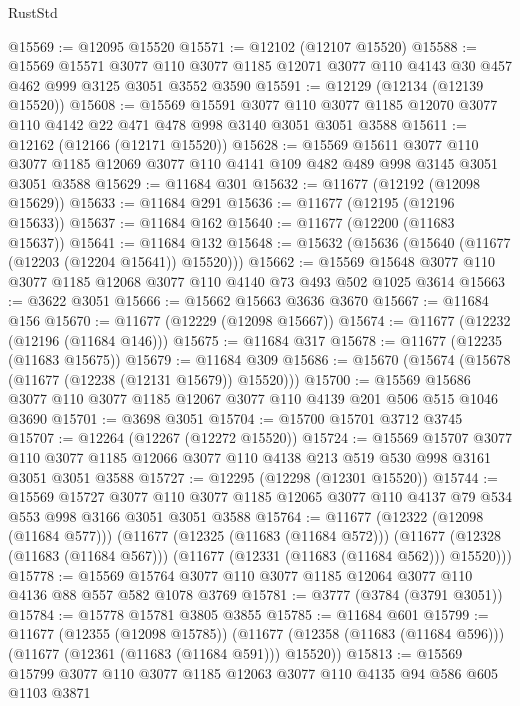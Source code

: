 \begin{lexlean}{RustStd}
\begin{coremodule}
@15569 := @12095 @15520
@15571 := @12102 (@12107 @15520)
@15588 := @15569
    @15571
    @3077
    @110
    @3077
    @1185
    @12071
    @3077
    @110
    @4143
    @30
    @457
    @462
    @999
    @3125
    @3051
    @3552
    @3590
@15591 := @12129 (@12134 (@12139 @15520))
@15608 := @15569
    @15591
    @3077
    @110
    @3077
    @1185
    @12070
    @3077
    @110
    @4142
    @22
    @471
    @478
    @998
    @3140
    @3051
    @3051
    @3588
@15611 := @12162 (@12166 (@12171 @15520))
@15628 := @15569
    @15611
    @3077
    @110
    @3077
    @1185
    @12069
    @3077
    @110
    @4141
    @109
    @482
    @489
    @998
    @3145
    @3051
    @3051
    @3588
@15629 := @11684 @301
@15632 := @11677 (@12192 (@12098 @15629))
@15633 := @11684 @291
@15636 := @11677 (@12195 (@12196 @15633))
@15637 := @11684 @162
@15640 := @11677 (@12200 (@11683 @15637))
@15641 := @11684 @132
@15648 := @15632 (@15636 (@15640 (@11677 (@12203 (@12204 @15641)) @15520)))
@15662 := @15569 @15648 @3077 @110 @3077 @1185 @12068 @3077 @110 @4140 @73 @493 @502 @1025 @3614
@15663 := @3622 @3051
@15666 := @15662 @15663 @3636 @3670
@15667 := @11684 @156
@15670 := @11677 (@12229 (@12098 @15667))
@15674 := @11677 (@12232 (@12196 (@11684 @146)))
@15675 := @11684 @317
@15678 := @11677 (@12235 (@11683 @15675))
@15679 := @11684 @309
@15686 := @15670 (@15674 (@15678 (@11677 (@12238 (@12131 @15679)) @15520)))
@15700 := @15569 @15686 @3077 @110 @3077 @1185 @12067 @3077 @110 @4139 @201 @506 @515 @1046 @3690
@15701 := @3698 @3051
@15704 := @15700 @15701 @3712 @3745
@15707 := @12264 (@12267 (@12272 @15520))
@15724 := @15569
    @15707
    @3077
    @110
    @3077
    @1185
    @12066
    @3077
    @110
    @4138
    @213
    @519
    @530
    @998
    @3161
    @3051
    @3051
    @3588
@15727 := @12295 (@12298 (@12301 @15520))
@15744 := @15569
    @15727
    @3077
    @110
    @3077
    @1185
    @12065
    @3077
    @110
    @4137
    @79
    @534
    @553
    @998
    @3166
    @3051
    @3051
    @3588
@15764 := @11677
    (@12322 (@12098 (@11684 @577)))
    (@11677
      (@12325 (@11683 (@11684 @572)))
      (@11677 (@12328 (@11683 (@11684 @567))) (@11677 (@12331 (@11683 (@11684 @562))) @15520)))
@15778 := @15569 @15764 @3077 @110 @3077 @1185 @12064 @3077 @110 @4136 @88 @557 @582 @1078 @3769
@15781 := @3777 (@3784 (@3791 @3051))
@15784 := @15778 @15781 @3805 @3855
@15785 := @11684 @601
@15799 := @11677
    (@12355 (@12098 @15785))
    (@11677 (@12358 (@11683 (@11684 @596))) (@11677 (@12361 (@11683 (@11684 @591))) @15520))
@15813 := @15569 @15799 @3077 @110 @3077 @1185 @12063 @3077 @110 @4135 @94 @586 @605 @1103 @3871

\end{coremodule}
\end{lexlean}
